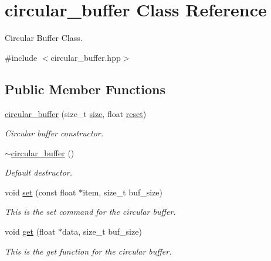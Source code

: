 \hypertarget{classcircular__buffer}{}\section{circular\+\_\+buffer Class Reference}
\label{classcircular__buffer}


Circular Buffer Class.  




{\ttfamily \#include $<$circular\+\_\+buffer.\+hpp$>$}

\subsection*{Public Member Functions}
\begin{DoxyCompactItemize}
\item 
\hyperlink{classcircular__buffer_a7be48ff2159478cb59111c7f0e888799}{circular\+\_\+buffer} (size\+\_\+t \hyperlink{classcircular__buffer_ae8fb2f8eb0275b98b6767d5e3979787a}{size}, float \hyperlink{classcircular__buffer_a36426e279d80a1616fb858582eae3f1f}{reset})
\begin{DoxyCompactList}\small\item\em Circular buffer constructor. \end{DoxyCompactList}\item 
\mbox{\label{classcircular__buffer_af63809aa67a0ab961bfddb5a143b3a74}} 
\hyperlink{classcircular__buffer_af63809aa67a0ab961bfddb5a143b3a74}{$\sim$circular\+\_\+buffer} ()
\begin{DoxyCompactList}\small\item\em Default destructor. \end{DoxyCompactList}\item 
void \hyperlink{classcircular__buffer_a0b2b66f74f1e588ed452caaf8cbbbe8e}{set} (const float $\ast$item, size\+\_\+t buf\+\_\+size)
\begin{DoxyCompactList}\small\item\em This is the set command for the circular buffer. \end{DoxyCompactList}\item 
void \hyperlink{classcircular__buffer_a98ceb4a6a8a321dec5f4ad6fb70e3ca6}{get} (float $\ast$data, size\+\_\+t buf\+\_\+size)
\begin{DoxyCompactList}\small\item\em This is the get function for the circular buffer. \end{DoxyCompactList}\item 

\end{DoxyCompactItemize}
